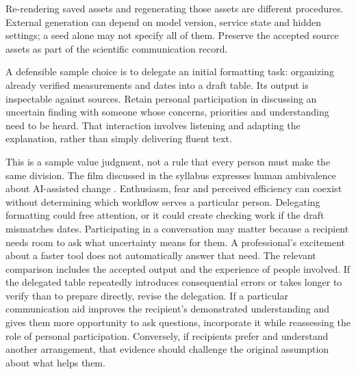 Re-rendering saved assets and regenerating those assets are different procedures. External generation can depend on model version, service state and hidden settings; a seed alone may not specify all of them. Preserve the accepted source assets as part of the scientific communication record.

\biomedicalanswer
{}
A defensible sample choice is to delegate an initial formatting task: organizing already verified measurements and dates into a draft table. Its output is inspectable against sources. Retain personal participation in discussing an uncertain finding with someone whose concerns, priorities and understanding need to be heard. That interaction involves listening and adapting the explanation, rather than simply delivering fluent text.

This is a sample value judgment, not a rule that every person must make the same division. The film discussed in the syllabus expresses human ambivalence about AI-assisted change \citep{knudsen2026changed}. Enthusiasm, fear and perceived efficiency can coexist without determining which workflow serves a particular person.
Delegating formatting could free attention, or it could create checking work if the draft mismatches dates. Participating in a conversation may matter because a recipient needs room to ask what uncertainty means for them. A professional's excitement about a faster tool does not automatically answer that need. The relevant comparison includes the accepted output and the experience of people involved.
If the delegated table repeatedly introduces consequential errors or takes longer to verify than to prepare directly, revise the delegation. If a particular communication aid improves the recipient's demonstrated understanding and gives them more opportunity to ask questions, incorporate it while reassessing the role of personal participation. Conversely, if recipients prefer and understand another arrangement, that evidence should challenge the original assumption about what helps them.

